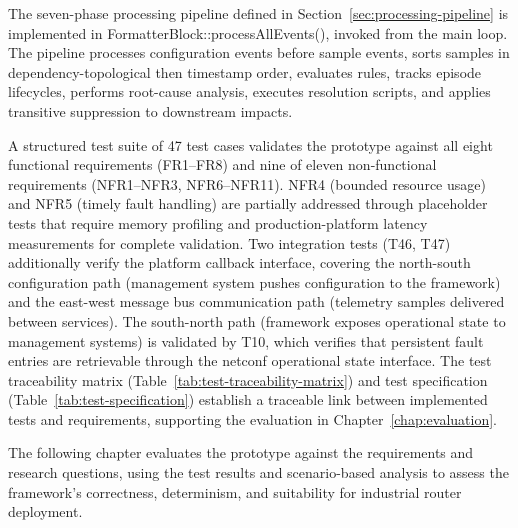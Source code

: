 The seven-phase processing pipeline defined in Section~\ref{sec:processing-pipeline} is implemented in FormatterBlock::processAllEvents(), invoked from the main loop. The pipeline processes configuration events before sample events, sorts samples in dependency-topological then timestamp order, evaluates rules, tracks episode lifecycles, performs root-cause analysis, executes resolution scripts, and applies transitive suppression to downstream impacts.

A structured test suite of 47 test cases validates the prototype against all eight functional requirements (FR1--FR8) and nine of eleven non-functional requirements (NFR1--NFR3, NFR6--NFR11). NFR4 (bounded resource usage) and NFR5 (timely fault handling) are partially addressed through placeholder tests that require memory profiling and production-platform latency measurements for complete validation. Two integration tests (T46, T47) additionally verify the platform callback interface, covering the north-south configuration path (management system pushes configuration to the framework) and the east-west message bus communication path (telemetry samples delivered between services). The south-north path (framework exposes operational state to management systems) is validated by T10, which verifies that persistent fault entries are retrievable through the \gls{netconf} operational state interface. The test traceability matrix (Table~\ref{tab:test-traceability-matrix}) and test specification (Table~\ref{tab:test-specification}) establish a traceable link between implemented tests and requirements, supporting the evaluation in Chapter~\ref{chap:evaluation}.

The following chapter evaluates the prototype against the requirements and research questions, using the test results and scenario-based analysis to assess the framework's correctness, determinism, and suitability for industrial router deployment.